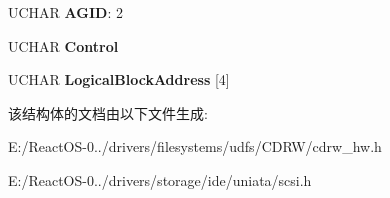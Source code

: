 \begin{DoxyCompactItemize}
\item 
\mbox{\label{struct___c_d_b_1_1___r_e_p_o_r_t___k_e_y_af6a130c69f933eed8b1701bcf26f50d1}} 
U\+C\+H\+AR {\bfseries A\+G\+ID}\+: 2
\item 
\mbox{\label{struct___c_d_b_1_1___r_e_p_o_r_t___k_e_y_af5e82918e7a6649a9138e41b4ebfcae4}} 
U\+C\+H\+AR {\bfseries Control}
\item 
\mbox{\label{struct___c_d_b_1_1___r_e_p_o_r_t___k_e_y_aa2584a6253e5fcbfd23c6bc552898e9c}} 
U\+C\+H\+AR {\bfseries Logical\+Block\+Address} \mbox{[}4\mbox{]}
\end{DoxyCompactItemize}


该结构体的文档由以下文件生成\+:\begin{DoxyCompactItemize}
\item 
E\+:/\+React\+O\+S-\/0../drivers/filesystems/udfs/\+C\+D\+R\+W/cdrw\+\_\+hw.\+h\item 
E\+:/\+React\+O\+S-\/0../drivers/storage/ide/uniata/scsi.\+h\end{DoxyCompactItemize}
